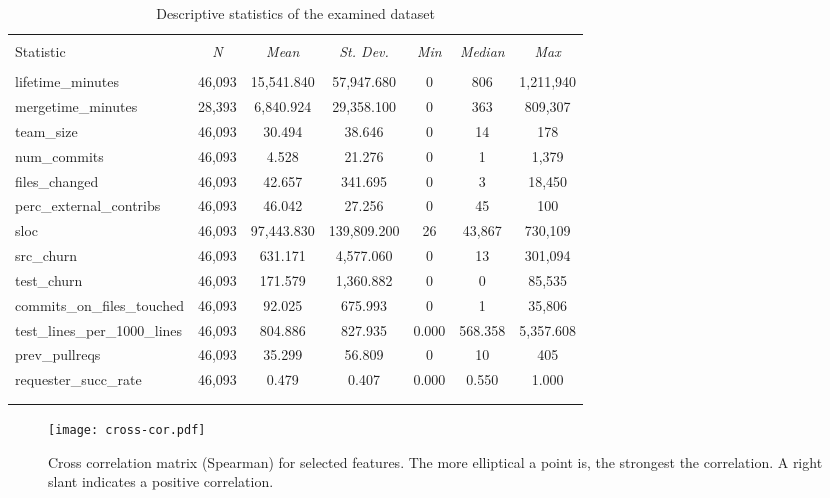\documentclass{sig-alternate}
\begin{document}
\begin{table*} \centering 
  \caption{Descriptive statistics of the examined dataset} 
\footnotesize 
\begin{tabular}{@{\extracolsep{5pt}}l c c c c c c } 
\\[-1.8ex]\hline 
\hline \\[-1.8ex] 
Statistic & \multicolumn{1}{c}{\textit{N}} & \multicolumn{1}{c}{\textit{Mean}} & \multicolumn{1}{c}{\textit{St. Dev.}} & \multicolumn{1}{c}{\textit{Min}} & \multicolumn{1}{c}{\textit{Median}} & \multicolumn{1}{c}{\textit{Max}} \\ 
\hline \\[-1.8ex] 
lifetime\_minutes & 46,093 & 15,541.840 & 57,947.680 & 0 & 806 & 1,211,940 \\ 
mergetime\_minutes & 28,393 & 6,840.924 & 29,358.100 & 0 & 363 & 809,307 \\ 
team\_size & 46,093 & 30.494 & 38.646 & 0 & 14 & 178 \\ 
num\_commits & 46,093 & 4.528 & 21.276 & 0 & 1 & 1,379 \\ 
files\_changed & 46,093 & 42.657 & 341.695 & 0 & 3 & 18,450 \\ 
perc\_external\_contribs & 46,093 & 46.042 & 27.256 & 0 & 45 & 100 \\ 
sloc & 46,093 & 97,443.830 & 139,809.200 & 26 & 43,867 & 730,109 \\ 
src\_churn & 46,093 & 631.171 & 4,577.060 & 0 & 13 & 301,094 \\ 
test\_churn & 46,093 & 171.579 & 1,360.882 & 0 & 0 & 85,535 \\ 
commits\_on\_files\_touched & 46,093 & 92.025 & 675.993 & 0 & 1 & 35,806 \\ 
test\_lines\_per\_1000\_lines & 46,093 & 804.886 & 827.935 & 0.000 & 568.358 & 5,357.608 \\ 
prev\_pullreqs & 46,093 & 35.299 & 56.809 & 0 & 10 & 405 \\ 
requester\_succ\_rate & 46,093 & 0.479 & 0.407 & 0.000 & 0.550 & 1.000 \\ 
\hline \\[-1.8ex] 
\normalsize 
\end{tabular} 
\end{table*} 

\begin{figure}
  \begin{center}
    \texttt{[image: cross-cor.pdf]}
  \end{center}
  \caption{Cross correlation matrix (Spearman) for selected features. The more elliptical a point is, the strongest the correlation. A right slant indicates
  a positive correlation.}
  \label{fig:crosscor}
\end{figure}
\end{document}
